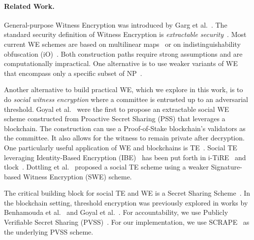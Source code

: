 \paragraph{Related Work.}
General-purpose Witness Encryption was introduced by Garg et al.~\cite{witness_encryption}.
The standard security definition of Witness Encryption is \emph{extractable security}~\cite{turing_machine_fe}.
Most current WE schemes are based on multilinear maps~\cite{witness_encryption,we_multilinear_map} or on indistinguishability obfuscation (iO)~\cite{we_io}. Both construction paths require strong assumptions and are computationally impractical.
One alternative is to use weaker variants of WE that encompass only a specific subset of \textsf{NP}~\cite{MrNISC}.

Another alternative to build practical WE, which we explore in this work, is to do \emph{social witness encryption} where a committee is entrusted up to an adversarial threshold.
Goyal et al.~\cite{eweb} were the first to propose an extractable social WE scheme constructed from Proactive Secret Sharing (PSS) that leverages a blockchain.
The construction can use a Proof-of-Stake blockchain's validators as the committee.
It also allows for the witness to remain private after decryption.
One particularly useful application of WE and blockchains is TE~\cite{timelock_puzzles,timelock_from_crc,timed_release_cryptography}.
Social TE leveraging Identity-Based Encryption (IBE)~\cite{ibe} has been put forth in i-TiRE~\cite{i-TiRE} and tlock~\cite{tlock}.
Dottling et al.~\cite{mcfly} proposed a social TE scheme using a weaker Signature-based Witness Encryption (SWE) scheme.

The critical building block for social TE and WE is a Secret Sharing Scheme~\cite{shamir_ss}. In the blockchain setting, threshold encryption was previously explored in works by Benhamouda et al.~\cite{benhamouda_ecpss} and Goyal et al.~\cite{eweb}.
For accountability, we use Publicly Verifiable Secret Sharing (PVSS)~\cite{first_pvss_chor,pvss_stadler}.
For our implementation, we use SCRAPE~\cite{pvss_scrape} as the underlying PVSS scheme.


%

